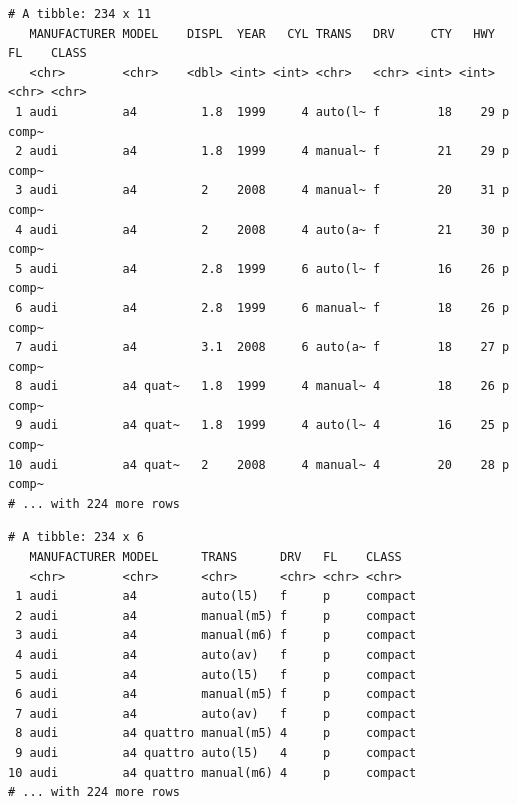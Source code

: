 \documentclass[
  11pt,
]{krantz}
\newenvironment{Shaded}{\begin{snugshade}}{\end{snugshade}}
\newcommand{\CommentTok}[1]{\textcolor[rgb]{0.37,0.37,0.37}{\textit{#1}}}
\newcommand{\KeywordTok}[1]{\textcolor[rgb]{0.27,0.27,0.27}{\textbf{#1}}}
\newcommand{\NormalTok}[1]{#1}
\newcommand{\OperatorTok}[1]{\textcolor[rgb]{0.43,0.43,0.43}{\textbf{#1}}}
\newcommand{\StringTok}[1]{\textcolor[rgb]{0.5,0.5,0.5}{#1}}
\begin{document}
\footnotesize

\begin{Shaded}
\end{Shaded}

\begin{verbatim}
# A tibble: 234 x 11
   MANUFACTURER MODEL    DISPL  YEAR   CYL TRANS   DRV     CTY   HWY FL    CLASS
   <chr>        <chr>    <dbl> <int> <int> <chr>   <chr> <int> <int> <chr> <chr>
 1 audi         a4         1.8  1999     4 auto(l~ f        18    29 p     comp~
 2 audi         a4         1.8  1999     4 manual~ f        21    29 p     comp~
 3 audi         a4         2    2008     4 manual~ f        20    31 p     comp~
 4 audi         a4         2    2008     4 auto(a~ f        21    30 p     comp~
 5 audi         a4         2.8  1999     6 auto(l~ f        16    26 p     comp~
 6 audi         a4         2.8  1999     6 manual~ f        18    26 p     comp~
 7 audi         a4         3.1  2008     6 auto(a~ f        18    27 p     comp~
 8 audi         a4 quat~   1.8  1999     4 manual~ 4        18    26 p     comp~
 9 audi         a4 quat~   1.8  1999     4 auto(l~ 4        16    25 p     comp~
10 audi         a4 quat~   2    2008     4 manual~ 4        20    28 p     comp~
# ... with 224 more rows
\end{verbatim}

\begin{Shaded}
\end{Shaded}

\begin{verbatim}
# A tibble: 234 x 6
   MANUFACTURER MODEL      TRANS      DRV   FL    CLASS  
   <chr>        <chr>      <chr>      <chr> <chr> <chr>  
 1 audi         a4         auto(l5)   f     p     compact
 2 audi         a4         manual(m5) f     p     compact
 3 audi         a4         manual(m6) f     p     compact
 4 audi         a4         auto(av)   f     p     compact
 5 audi         a4         auto(l5)   f     p     compact
 6 audi         a4         manual(m5) f     p     compact
 7 audi         a4         auto(av)   f     p     compact
 8 audi         a4 quattro manual(m5) 4     p     compact
 9 audi         a4 quattro auto(l5)   4     p     compact
10 audi         a4 quattro manual(m6) 4     p     compact
# ... with 224 more rows
\end{verbatim}
\end{document}

